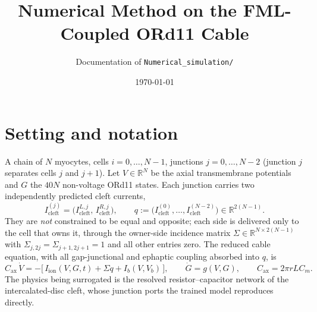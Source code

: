 \documentclass[11pt]{article}
\title{\bfseries Numerical Method on the FML-Coupled ORd11 Cable}
\author{Documentation of \texttt{Numerical\_simulation/}}
\date{\today}
\newcommand{\Icl}{I_{\mathrm{cleft}}}
\newcommand{\Iion}{I_{\mathrm{ion}}}
\newcommand{\Ib}{I_{b}}
\newcommand{\Cax}{C_{\mathrm{ax}}}
\newcommand{\Rn}{\mathbb{R}}
\begin{document}
\maketitle
\vspace{-1.5em}

\section{Setting and notation}

A chain of $N$ myocytes, cells $i=0,\dots,N-1$, junctions $j=0,\dots,N-2$
(junction $j$ separates cells $j$ and $j+1$). Let $V\in\Rn^{N}$ be the axial
transmembrane potentials and $G$ the $40N$ non-voltage ORd11 states. Each junction carries two independently predicted cleft
currents,
\begin{equation}
\Icl^{(j)}=\bigl(\Icl^{L,j},\,\Icl^{R,j}\bigr),
\qquad
q:=\bigl(\Icl^{(0)},\dots,\Icl^{(N-2)}\bigr)\in\Rn^{2(N-1)}.
\end{equation}
They are \emph{not} constrained to be equal and opposite; each side is delivered
only to the cell that owns it, through the owner-side incidence matrix
$\Sigma\in\Rn^{N\times 2(N-1)}$ with $\Sigma_{j,2j}=\Sigma_{j+1,2j+1}=1$ and all
other entries zero. The reduced cable equation, with all gap-junctional and
ephaptic coupling absorbed into $q$, is
\begin{equation}
\Cax\,\dot V = -\bigl[\,\Iion(V,G,t)+\Sigma q+\Ib(V,V_b)\,\bigr],
\qquad \dot G=g(V,G),
\qquad \Cax=2\pi rLC_m.
\label{eq:cable}
\end{equation}
The physics being surrogated is the resolved resistor--capacitor network of the
intercalated-disc cleft, whose junction ports the trained model reproduces
directly.
\end{document}
